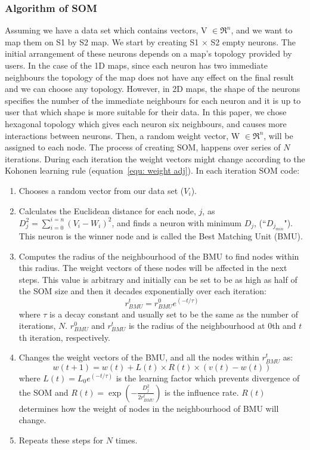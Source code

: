 \documentclass[useAMS,usenatbib]{mn2e}
\newcommand \boldit {\textbf{\textit{}}}
\begin{document}
 \subsubsection{Algorithm of SOM} 
 \label{sec: algorithm}
     Assuming we have a data set which contains vectors, \boldit{V} $\in \Re^n$, and we want to map them on S1 by S2 map. 
     We start by creating S1 $\times$ S2 empty neurons. 
     The initial arrangement of these neurons depends on a map's topology provided by users.
     In the case of the 1D maps, since each neuron has two immediate neighbours the topology of the map does not have any effect on the final result and we can choose any topology.
     However, in 2D maps, the shape of the neurons specifies the number of the immediate neighbours for each neuron and it is up to user that which shape is more suitable for their data.
     In this paper, we chose hexagonal topology which gives each neuron six neighbours, and causes more interactions between neurons.
     Then, a random weight vector, \boldit{W} $\in \Re^n$, will be assigned to each node.
     The process of creating SOM, happens over series of $N$ iterations. 
     During each iteration the weight vectors might change according to the Kohonen learning rule (equation~\ref{equ: weight adj}). 
      In each iteration SOM code:
     \begin{enumerate}
        \item Chooses a random vector from our data set ($V_i$).
        \item Calculates the Euclidean distance for each node, $j$, as  $D_j^2= \sum_{i=0}^{i=n} (V_i - W_i)^2$, and finds a neuron with minimum $D_j$, (``$D_{j_{min}}$"). This neuron is the winner node and is called the Best Matching Unit (BMU). 
        \item  Computes the radius of the neighbourhood of the BMU to find nodes within this radius. The weight vectors of these nodes will be affected in the next steps. This value is arbitrary and initially can be set to be as high as half of the SOM size and then it decades exponentially over each iteration:
        \begin{equation}
            r^t_{BMU} = r^0_{BMU}e^{(-t/\tau)}
        \end{equation}
        where $\tau$ is a decay constant and usually set to be the same as the number of iterations, $N$. $r^0_{BMU}$ and $r^t_{BMU}$ is the radius of the neighbourhood at 0th and $t$th iteration, respectively. 
        \item Changes the weight vectors of the BMU, and all the nodes within $r^t_{BMU}$ as:
        \begin{equation}
            \label{equ: weight adj}
            w(t+1)=w(t)+L(t) \times R(t) \times(v(t)-w(t))
        \end{equation}
        where $L(t) = L_0 e^{(-t/\tau)}$ is the learning factor which prevents divergence of the SOM and $R(t)=\exp(-\frac{D_j^2}{2r^t_{BMU}})$ is the influence rate. $R(t)$ determines how the weight of nodes in the neighbourhood of BMU will change.
        \item  Repeats these steps for $N$ times.
     \end{enumerate}
     
\end{document}
